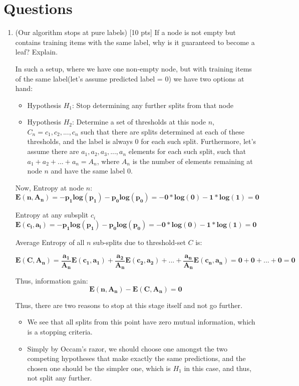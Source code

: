\documentclass[a4paper]{article}
\theoremstyle{definition}
\newenvironment{soln}{
    \leavevmode\color{blue}\ignorespaces
}{}
\begin{document}
\section{Questions}
\begin{enumerate}
\item (Our algorithm stops at pure labels) [10 pts] If a node is not empty but contains training items with the same label, why is it guaranteed to become a leaf?  Explain.


\begin{soln}  

In such a setup, where we have one non-empty node, but with training items of the same label(let's assume predicted label = $0$) we have two options at hand:
\begin{itemize}
	\item Hypothesis $H_{1}$: Stop determining any further splits from that node
	\item Hypothesis $H_{2}$: Determine a set of thresholds at this node $n$, $C_n = {c_1, c_2, ... ,c_n} $ such that there are splits determined at each of these thresholds, and the label is always $0$ for each such split. Furthermore, let's assume there are $a_1, a_2, a_3, ..., a_n$ elements for each such split, such that $a_1 + a_2 + ... + a_n = A_n$, where $A_n$ is the number of elements remaining at node $n$ and have the same label $0$.
\end{itemize}

Now, Entropy at node $n$: 
$$
\mathbf{E(n, A_n) = - p_1 log(p_1) - p_0 log(p_0) = -0*log(0) - 1*log(1) = 0}
$$


Entropy at any subsplit $c_i$
$$
\mathbf{E(c_i, a_i) = - p_1 log(p_1) - p_0 log(p_0) = -0*log(0) - 1*log(1) = 0}
$$

Average Entropy of  all $n$ sub-splits due to threshold-set $C$ is:

$$
\mathbf{E(C, A_n) = \frac{a_1}{A_n} E(c_1, a_1) + \frac{a_2}{A_n} E(c_2, a_2) + ... + \frac{a_n}{A_n} E(c_n, a_n) = 0 + 0 + ... + 0 = 0}
$$

Thus, information gain: 
$$
\mathbf{E(n, A_n) - E(C, A_n) = 0}
$$

Thus, there are two reasons to stop at this stage itself and not go further.

\begin{itemize}
	\item We see that all splits from this point have zero mutual information, which is a stopping criteria.
	\item Simply by Occam's razor, we should choose one amongst the two competing hypotheses that make exactly the same predictions, and the chosen one should be the simpler one, which is $H_1$ in this case, and thus, not split any further.
\end{itemize}



\end{soln}
\end{enumerate}
\end{document}
